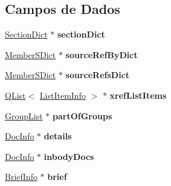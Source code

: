 \subsection*{Campos de Dados}
\begin{DoxyCompactItemize}
\item 
\hypertarget{class_definition_impl_a4082a9dfe4e179a51276f333c4eac762}{\hyperlink{class_section_dict}{Section\-Dict} $\ast$ {\bfseries section\-Dict}}\label{class_definition_impl_a4082a9dfe4e179a51276f333c4eac762}

\item 
\hypertarget{class_definition_impl_a8ee4433995799ccb8244ce127035e198}{\hyperlink{class_member_s_dict}{Member\-S\-Dict} $\ast$ {\bfseries source\-Ref\-By\-Dict}}\label{class_definition_impl_a8ee4433995799ccb8244ce127035e198}

\item 
\hypertarget{class_definition_impl_aff4a3f7703749db478f72e43381b51ed}{\hyperlink{class_member_s_dict}{Member\-S\-Dict} $\ast$ {\bfseries source\-Refs\-Dict}}\label{class_definition_impl_aff4a3f7703749db478f72e43381b51ed}

\item 
\hypertarget{class_definition_impl_a20e6435e40b83471cc1f1a8fc6cdbeff}{\hyperlink{class_q_list}{Q\-List}$<$ \hyperlink{struct_list_item_info}{List\-Item\-Info} $>$ $\ast$ {\bfseries xref\-List\-Items}}\label{class_definition_impl_a20e6435e40b83471cc1f1a8fc6cdbeff}

\item 
\hypertarget{class_definition_impl_a19403871d00e63b996c78ed16038d56f}{\hyperlink{class_group_list}{Group\-List} $\ast$ {\bfseries part\-Of\-Groups}}\label{class_definition_impl_a19403871d00e63b996c78ed16038d56f}

\item 
\hypertarget{class_definition_impl_a1f9b1ab52754c7c407e163777459df2c}{\hyperlink{struct_doc_info}{Doc\-Info} $\ast$ {\bfseries details}}\label{class_definition_impl_a1f9b1ab52754c7c407e163777459df2c}

\item 
\hypertarget{class_definition_impl_ae777022f6ffb57c1fab7564bfb2f4da2}{\hyperlink{struct_doc_info}{Doc\-Info} $\ast$ {\bfseries inbody\-Docs}}\label{class_definition_impl_ae777022f6ffb57c1fab7564bfb2f4da2}

\item 
\hypertarget{class_definition_impl_a749de0a96e9f5f0a310a78497add7f14}{\hyperlink{struct_brief_info}{Brief\-Info} $\ast$ {\bfseries brief}}\label{class_definition_impl_a749de0a96e9f5f0a310a78497add7f14}


\end{DoxyCompactItemize}
